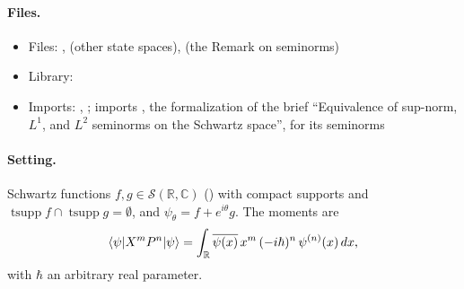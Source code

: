 \documentclass[11pt]{article}
\begin{document}
\paragraph{Files.}\leavevmode
\begin{itemize}
\item Files: ,\newline
   (other state spaces),\newline
   (the Remark on seminorms)
\item Library: 
\item Imports: ,\newline
  ;  imports
  , the formalization of the brief ``Equivalence of sup-norm, $L^1$, and $L^2$
  seminorms on the Schwartz space'', for its seminorms
\end{itemize}

\paragraph{Setting.} Schwartz functions $f, g \in \mathcal{S}(\mathbb{R}, \mathbb{C})$
() with compact supports and $\operatorname{tsupp} f \cap \operatorname{tsupp} g =
\emptyset$, and $\psi_\theta = f + e^{i\theta} g$. The moments are
\[
  \braket{\psi|X^m P^n|\psi} = \int_{\mathbb{R}} \overline{\psi(x)}\, x^m\,
  (-i\hbar)^n\, \psi^{(n)}(x)\, dx,
\]
with $\hbar$ an arbitrary real parameter.
\end{document}
